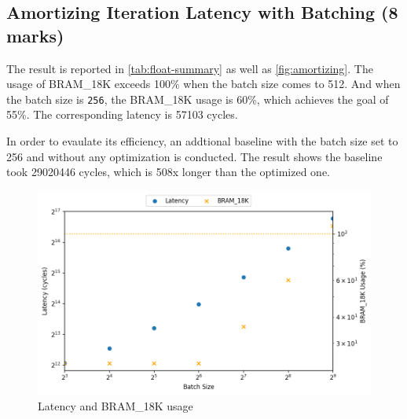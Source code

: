 \subsection{Amortizing Iteration Latency with Batching (8 marks)}
\label{sec:1d}


The result is reported in \autoref{tab:float-summary} as well as \autoref{fig:amortizing}.
The usage of BRAM\_18K exceeds 100\% when the batch size comes to 512.
And when the batch size is \texttt{256}, the BRAM\_18K usage is 60\%, which achieves the goal of 55\%.
The corresponding latency is 57103 cycles.

In order to evaulate its efficiency, an addtional baseline with the batch size set to 256 and without any optimization is conducted.
The result shows the baseline took 29020446 cycles, which is 508x longer than the optimized one.

\begin{figure}
    \centering
    \includegraphics[scale=0.64]{images/amortizing.png}
    \caption{Latency and BRAM\_18K usage}
    \label{fig:amortizing}
\end{figure}
